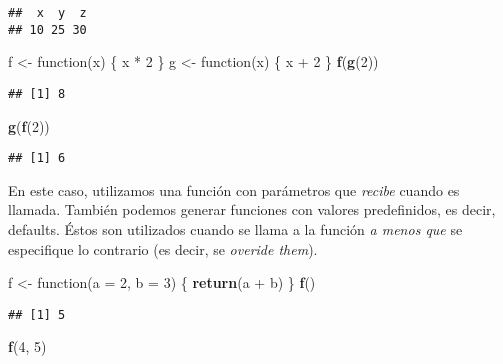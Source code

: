\documentclass[]{article}
\newenvironment{Shaded}{\begin{snugshade}}{\end{snugshade}}
\newcommand{\KeywordTok}[1]{\textcolor[rgb]{0.13,0.29,0.53}{\textbf{{#1}}}}
\newcommand{\DataTypeTok}[1]{\textcolor[rgb]{0.13,0.29,0.53}{{#1}}}
\newcommand{\DecValTok}[1]{\textcolor[rgb]{0.00,0.00,0.81}{{#1}}}
\newcommand{\StringTok}[1]{\textcolor[rgb]{0.31,0.60,0.02}{{#1}}}
\newcommand{\NormalTok}[1]{{#1}}
\begin{document}
\begin{verbatim}
##  x  y  z 
## 10 25 30
\end{verbatim}

\begin{Shaded}
\begin{Highlighting}[]
\NormalTok{f <-}\StringTok{ }\NormalTok{function(x) \{}
  \NormalTok{x *}\StringTok{ }\DecValTok{2}
\NormalTok{\}}
\NormalTok{g <-}\StringTok{ }\NormalTok{function(x) \{}
  \NormalTok{x +}\StringTok{ }\DecValTok{2}
\NormalTok{\}}
\KeywordTok{f}\NormalTok{(}\KeywordTok{g}\NormalTok{(}\DecValTok{2}\NormalTok{))}
\end{Highlighting}
\end{Shaded}

\begin{verbatim}
## [1] 8
\end{verbatim}

\begin{Shaded}
\begin{Highlighting}[]
\KeywordTok{g}\NormalTok{(}\KeywordTok{f}\NormalTok{(}\DecValTok{2}\NormalTok{))}
\end{Highlighting}
\end{Shaded}

\begin{verbatim}
## [1] 6
\end{verbatim}

En este caso, utilizamos una función con parámetros que \emph{recibe}
cuando es llamada. También podemos generar funciones con valores
predefinidos, es decir, defaults. Éstos son utilizados cuando se llama a
la función \emph{a menos que} se especifique lo contrario (es decir, se
\emph{overide them}).

\begin{Shaded}
\begin{Highlighting}[]
\NormalTok{f <-}\StringTok{ }\NormalTok{function(}\DataTypeTok{a =} \DecValTok{2}\NormalTok{, }\DataTypeTok{b =} \DecValTok{3}\NormalTok{) \{}
  \KeywordTok{return}\NormalTok{(a +}\StringTok{ }\NormalTok{b)}
\NormalTok{\}}
\KeywordTok{f}\NormalTok{()}
\end{Highlighting}
\end{Shaded}

\begin{verbatim}
## [1] 5
\end{verbatim}

\begin{Shaded}
\begin{Highlighting}[]
\KeywordTok{f}\NormalTok{(}\DecValTok{4}\NormalTok{, }\DecValTok{5}\NormalTok{)}
\end{Highlighting}
\end{Shaded}
\end{document}
